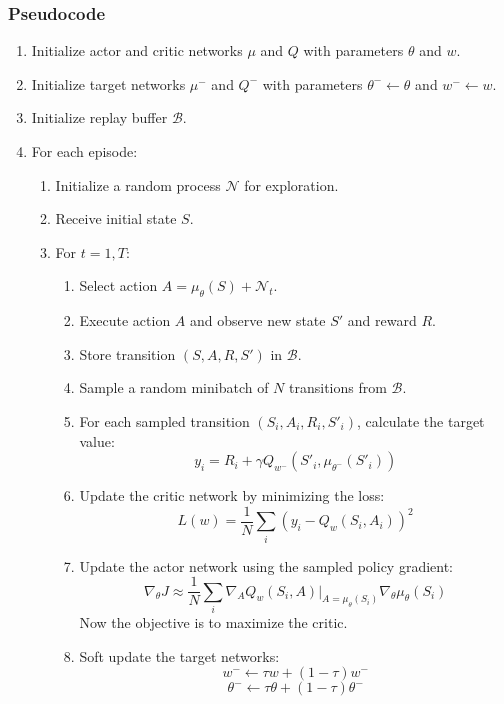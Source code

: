 \documentclass[12pt]{article}
\begin{document}
\subsubsection{Pseudocode}
\begin{enumerate}
    \item Initialize actor and critic networks $\mu$ and $Q$ with parameters $\theta$ and $w$.
    \item Initialize target networks $\mu^-$ and $Q^-$ with parameters $\theta^- \leftarrow \theta$ and $w^- \leftarrow w$.
    \item Initialize replay buffer $\mathcal{B}$.
    \item For each episode:
    \begin{enumerate}
        \item Initialize a random process $\mathcal{N}$ for exploration.
        \item Receive initial state $S$.
        \item For $t=1, T$:
        \begin{enumerate}
            \item Select action $A = \mu_\theta(S) + \mathcal{N}_t$.
            \item Execute action $A$ and observe new state $S'$ and reward $R$.
            \item Store transition $(S, A, R, S')$ in $\mathcal{B}$.
            \item Sample a random minibatch of $N$ transitions from $\mathcal{B}$.
            \item For each sampled transition $(S_i, A_i, R_i, S'_i)$, calculate the target value:
            \[
                y_i = R_i + \gamma Q_{w^-}(S'_i, \mu_{\theta^-}(S'_i))
            \]
            \item Update the critic network by minimizing the loss:
            \[
                L(w) = \frac{1}{N} \sum_i (y_i - Q_w(S_i, A_i))^2
            \]
            \item Update the actor network using the sampled policy gradient:
            \[
                \nabla_{\theta} J \approx \frac{1}{N} \sum_i \nabla_A Q_w(S_i, A)|_{A=\mu_\theta(S_i)} \nabla_\theta \mu_\theta(S_i)
            \]   Now the objective is to maximize the critic. 
            \item Soft update the target networks:
            \[
                w^- \leftarrow \tau w + (1-\tau)w^-
            \]
            \[
                \theta^- \leftarrow \tau \theta + (1-\tau)\theta^-
            \]
        \end{enumerate}
    \end{enumerate}
\end{enumerate}
\end{document}
